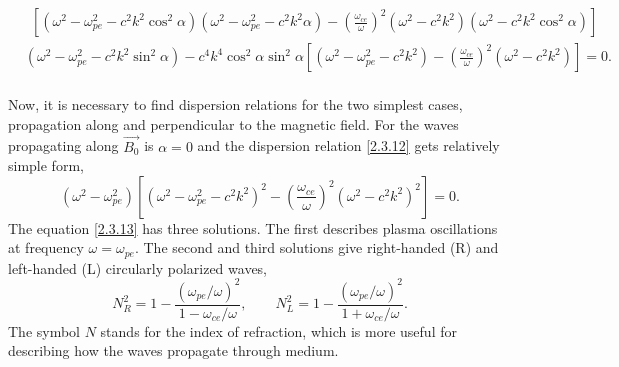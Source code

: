 \begin{equation}
\begin{split}
\label{2.3.12}
& \ \ \left[ \left( \omega^{2} - \omega_{pe}^{2} - c^{2} k^{2} \cos^{2} \alpha \right) \left( \omega^{2} - \omega_{pe}^{2} - c^{2} k^{2} \alpha \right) - \left(  \frac{\omega_{ce}}{\omega} \right)^{2} \left( \omega^{2} - c^{2} k^{2} \right) \left( \omega^{2} - c^{2} k^{2} \cos^{2} \alpha \right) \right]\\[5pt]
& \left( \omega^{2} - \omega_{pe}^{2} - c^{2} k^{2} \sin^{2} \alpha \right) - c^{4} k^{4} \cos^{2} \alpha \sin^{2} \alpha \left[ \left( \omega^{2} - \omega_{pe}^{2} - c^{2} k^{2} \right) - \left( \frac{\omega_{ce}}{\omega} \right)^{2} \left( \omega^{2} - c^{2} k^{2} \right) \right] = 0.\\[5pt]
\end{split}
\end{equation}

Now, it is necessary to find dispersion relations for the two simplest cases, propagation along and perpendicular to the magnetic field. For the waves propagating along $ \vec{B_{0}} $ is $ \alpha = 0 $ and the dispersion relation \ref{2.3.12} gets relatively simple form,
\begin{equation}
\label{2.3.13}
\left( \omega^{2} - \omega_{pe}^{2} \right) \left[ \left( \omega^{2} - \omega_{pe}^{2} - c^{2} k^{2} \right)^{2}  - \left( \frac{\omega_{ce}}{\omega} \right)^{2} \left( \omega^{2} - c^{2} k^{2} \right)^{2} \right] = 0.
\end{equation}
The equation \ref{2.3.13} has three solutions. The first describes plasma oscillations at frequency $ \omega = \omega_{pe} $. The second and third solutions give right-handed (R) and left-handed (L) circularly polarized waves,
\begin{equation}
\label{2.3.14}
N_{R}^{2} = 1 - \frac{\left( \omega_{pe} / \omega\right)^{2} }{1 - \omega_{ce} / \omega}, \qquad N_{L}^{2} = 1 - \frac{\left( \omega_{pe} / \omega\right)^{2} }{1 + \omega_{ce} / \omega}.
\end{equation}
The symbol $ N $ stands for the index of refraction, which is more useful for describing how the waves propagate through medium.

